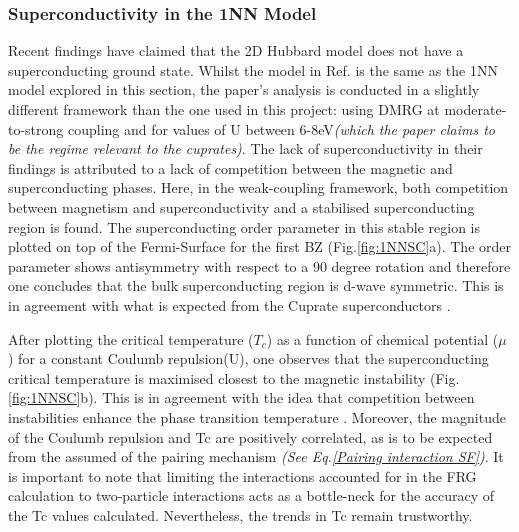 \documentclass[12pt]{article}
\begin{document}
\subsubsection{Superconductivity in the 1NN Model}

Recent findings have claimed that the 2D Hubbard model does not have a superconducting ground state\cite{qin2020absence}. 
Whilst the model in Ref. \cite{qin2020absence} is the same as the 1NN model explored in this section, the paper's analysis is conducted in a 
slightly different framework than the one used in this project: using DMRG \cite{white1992density} 
at moderate-to-strong coupling and for values of U between 6-8eV\textit{(which the paper claims to be the 
regime relevant to the cuprates)}.
The lack of superconductivity in their findings is attributed to a lack of competition 
between the magnetic and superconducting phases. Here, in the weak-coupling framework, both  competition between magnetism and superconductivity and 
a stabilised superconducting region is found. The superconducting order parameter in this stable region is plotted on top of the Fermi-Surface for the first BZ (Fig.\ref{fig:1NNSC}a).
The order parameter shows antisymmetry with respect to a 90 degree rotation and therefore one concludes that
the bulk superconducting region is d-wave symmetric. This is in agreement with what is expected from the Cuprate superconductors \cite{tsuei2000pairing}.\par
\medskip
\noindent 
After plotting the critical temperature ($T_c$) as a function of chemical potential ($\mu$) for a constant Coulumb repulsion(U), one observes that
the superconducting critical temperature is maximised closest to the magnetic instability (Fig.\ref{fig:1NNSC}b).
This is in agreement with the idea that competition between instabilities
enhance the phase transition temperature \cite{maple1995interplay,sun2016dome}. Moreover, the magnitude of the Coulumb repulsion and Tc are positively correlated, as is to be expected from the assumed 
of the pairing mechanism \textit{(See Eq.\ref{Pairing interaction SF})}.
It is important to note that limiting the interactions 
accounted for in the FRG calculation to two-particle interactions acts as a bottle-neck for the accuracy 
of the Tc values calculated. Nevertheless, the trends in Tc remain trustworthy. 
\end{document}
